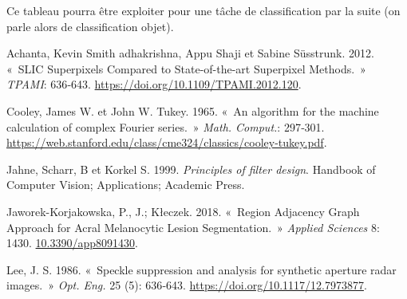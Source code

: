 \documentclass[
]{article}
\newlength{\cslhangindent}
\newenvironment{CSLReferences}[2] %
 {\begin{list}{}{%
  \setlength{\itemindent}{0pt}
  \setlength{\leftmargin}{0pt}
  \setlength{\parsep}{0pt}
  \ifodd #1
   \setlength{\leftmargin}{\cslhangindent}
   \setlength{\itemindent}{-1\cslhangindent}
  \fi
  \setlength{\itemsep}{#2\baselineskip}}}
 {\end{list}}
\begin{document}
Ce tableau pourra être exploiter pour une tâche de classification par la
suite (on parle alors de classification objet).

\label{refs}
\begin{CSLReferences}{1}{0}
Achanta, Kevin Smith adhakrishna, Appu Shaji et Sabine Süsstrunk. 2012.
{«~SLIC Superpixels Compared to State-of-the-art Superpixel Methods.~»}
\emph{{TPAMI}}: 636‑643. \url{https://doi.org/10.1109/TPAMI.2012.120}.

Cooley, James W. et John W. Tukey. 1965. {«~An algorithm for the machine
calculation of complex Fourier series.~»} \emph{{Math. Comput.}}:
297‑301.
\url{https://web.stanford.edu/class/cme324/classics/cooley-tukey.pdf}.

Jahne, Scharr, B et Korkel S. 1999. \emph{Principles of filter design}.
Handbook of Computer Vision; Applications; Academic Press.

Jaworek-Korjakowska, P., J.; Kłeczek. 2018. {«~Region Adjacency Graph
Approach for Acral Melanocytic Lesion Segmentation.~»} \emph{{Applied
Sciences}} 8: 1430.
\href{https://10.3390/app8091430}{10.3390/app8091430}.

Lee, J. S. 1986. {«~Speckle suppression and analysis for synthetic
aperture radar images.~»} \emph{{Opt. Eng.}} 25 (5): 636‑643.
\url{https://doi.org/10.1117/12.7973877}.

\end{CSLReferences}
\end{document}
